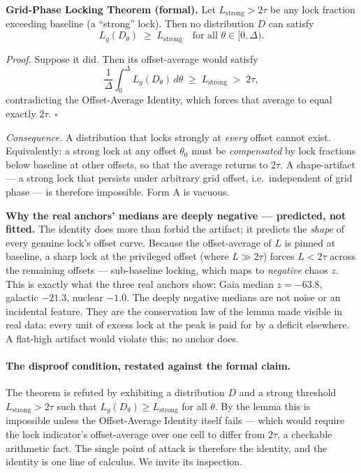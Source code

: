 \documentclass[11pt, letterpaper, openany]{book}
\begin{document}
\begin{refutebox}
\textbf{Grid-Phase Locking Theorem (formal).} Let $L_{\text{strong}} > 2\tau$ be any
lock fraction exceeding baseline (a ``strong'' lock). Then no distribution $D$ can satisfy
\[
  L_g(D_\theta) \;\geq\; L_{\text{strong}} \quad\text{for all } \theta \in [0,\Delta).
\]
 
\textit{Proof.} Suppose it did. Then its offset-average would satisfy
\[
  \frac{1}{\Delta}\int_0^\Delta L_g(D_\theta)\,d\theta \;\geq\; L_{\text{strong}} \;>\; 2\tau,
\]
contradicting the Offset-Average Identity, which forces that average to equal exactly $2\tau$.
\hfill$\square$
 
\textit{Consequence.} A distribution that locks strongly at \emph{every} offset cannot exist.
Equivalently: a strong lock at any offset $\theta_0$ must be \emph{compensated} by lock
fractions below baseline at other offsets, so that the average returns to $2\tau$. A shape-artifact
--- a strong lock that persists under arbitrary grid offset, i.e.\ independent of grid phase ---
is therefore impossible. Form A is vacuous.
\end{refutebox}
 
\begin{signalbox}
\textbf{Why the real anchors' medians are deeply negative --- predicted, not fitted.} The
identity does more than forbid the artifact; it predicts the \emph{shape} of every genuine
lock's offset curve. Because the offset-average of $L$ is pinned at baseline, a sharp lock at
the privileged offset (where $L \gg 2\tau$) forces $L < 2\tau$ across the remaining offsets ---
sub-baseline locking, which maps to \emph{negative} chaos $z$. This is exactly what the three
real anchors show: Gaia median $z = -63.8$, galactic $-21.3$, nuclear $-1.0$. The deeply
negative medians are not noise or an incidental feature. They are the conservation law of the
lemma made visible in real data: every unit of excess lock at the peak is paid for by a deficit
elsewhere. A flat-high artifact would violate this; no anchor does.
\end{signalbox}
 
\paragraph{The disproof condition, restated against the formal claim.} The theorem is refuted by
exhibiting a distribution $D$ and a strong threshold $L_{\text{strong}} > 2\tau$ such that
$L_g(D_\theta) \geq L_{\text{strong}}$ for all $\theta$. By the lemma this is impossible unless
the Offset-Average Identity itself fails --- which would require the lock indicator's offset-average
over one cell to differ from $2\tau$, a checkable arithmetic fact. The single point of attack is
therefore the identity, and the identity is one line of calculus. We invite its inspection.
 
\end{document}
